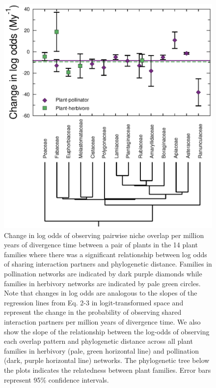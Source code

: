 \documentclass[12pt]{article}
\begin{document}
  \begin{figure}[!h]
    \begin{center}
      \centerline{\includegraphics*[height=.62\textheight]{Figures/dataplots/Family/allfams_full.eps}}
    \end{center}
     \caption{Change in log odds of observing pairwise niche overlap per million
     years of divergence time between a pair of plants
     in the 14 plant families where there was a significant
     relationship between log odds of sharing interaction
     partners and phylogenetic distance.
     Families in pollination networks are indicated
     by dark purple diamonds while families in herbivory
     networks are indicated by pale green circles.
     Note that changes in log odds are analogous to the 
     slopes of the regression lines from Eq. 2-3
     in logit-transformed space and represent
     the change in the probability of observing shared 
     interaction partners per million years of divergence time. We also
     show the slope of the relationship between the
     log-odds of observing each overlap pattern and 
     phylogenetic distance across all plant families
     in herbivory (pale, green horizontal line) and
     pollination (dark, purple horizontal line) networks.
     The phylogenetic tree below the plots indicates the
     relatedness between plant families. Error bars represent 95\% confidence
     intervals.}
    \label{within_family_regression}
  \end{figure}
\end{document}
